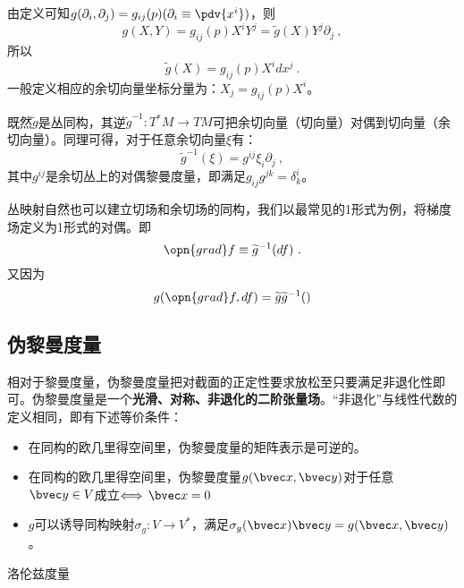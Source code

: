 由定义可知$g(\partial_i,\partial_j)=g_{ij}(p)(\partial_i\equiv\pdv{x^i})$，则
\begin{equation}
g(X,Y)=g_{ij}(p)X^iY^j=\widetilde g(X)Y^j\partial_j~,
\end{equation}
所以
\begin{equation}
\widetilde g(X)=g_{ij}(p)X^idx^j~.
\end{equation}
一般定义相应的余切向量坐标分量为：$X_j=g_{ij}(p)X^i$。

既然$\widetilde g$是丛同构，其逆$\widetilde g^{-1}:T^*M\rightarrow TM$可把余切向量（切向量）对偶到切向量（余切向量）。同理可得，对于任意余切向量$\xi$有：
\begin{equation}
\widetilde g^{-1}(\xi)=g^{ij} \xi_i\partial_j~,
\end{equation}
其中$g^{ij}$是余切丛上的对偶黎曼度量，即满足$g_{ij}g^{jk}=\delta^i_k$。

丛映射自然也可以建立切场和余切场的同构，我们以最常见的1形式为例，将梯度场定义为1形式的对偶。即
\begin{equation}
\opn{grad} f\equiv \widetilde g^{-1}(df)~.
\end{equation}
又因为
\begin{equation}
g(\opn{grad}f,df)=\widetilde g\widetilde g^{-1}()
\end{equation}




\subsection{伪黎曼度量}
相对于黎曼度量，伪黎曼度量把对截面的正定性要求放松至只要满足非退化性即可。伪黎曼度量是一个\textbf{光滑、对称、非退化的二阶张量场}。“非退化”与线性代数的定义相同，即有下述等价条件：
\begin{itemize}
\item 在同构的欧几里得空间里，伪黎曼度量的矩阵表示是可逆的。
\item 在同构的欧几里得空间里，伪黎曼度量$g(\bvec x,\bvec y)$对于任意$\bvec y\in V$成立$\Longleftrightarrow\,\bvec x=0$
\item $g$可以诱导同构映射$\sigma_g:V\rightarrow V^*$，满足$\sigma_g(\bvec x)\bvec y=g(\bvec x,\bvec y)$。
\end{itemize}
\begin{example}{洛伦兹度量}

\end{example}